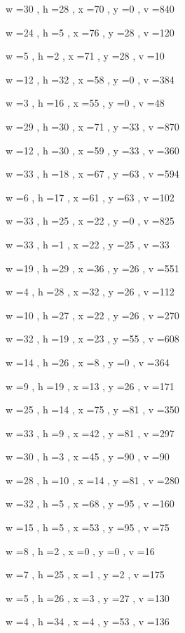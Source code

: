 \documentclass[11pt]{article}
\begin{document}
w =30 , h =28 , x =70 , y =0 , v =840
\par
w =24 , h =5 , x =76 , y =28 , v =120
\par
w =5 , h =2 , x =71 , y =28 , v =10
\par
w =12 , h =32 , x =58 , y =0 , v =384
\par
w =3 , h =16 , x =55 , y =0 , v =48
\par
w =29 , h =30 , x =71 , y =33 , v =870
\par
w =12 , h =30 , x =59 , y =33 , v =360
\par
w =33 , h =18 , x =67 , y =63 , v =594
\par
w =6 , h =17 , x =61 , y =63 , v =102
\par
w =33 , h =25 , x =22 , y =0 , v =825
\par
w =33 , h =1 , x =22 , y =25 , v =33
\par
w =19 , h =29 , x =36 , y =26 , v =551
\par
w =4 , h =28 , x =32 , y =26 , v =112
\par
w =10 , h =27 , x =22 , y =26 , v =270
\par
w =32 , h =19 , x =23 , y =55 , v =608
\par
w =14 , h =26 , x =8 , y =0 , v =364
\par
w =9 , h =19 , x =13 , y =26 , v =171
\par
w =25 , h =14 , x =75 , y =81 , v =350
\par
w =33 , h =9 , x =42 , y =81 , v =297
\par
w =30 , h =3 , x =45 , y =90 , v =90
\par
w =28 , h =10 , x =14 , y =81 , v =280
\par
w =32 , h =5 , x =68 , y =95 , v =160
\par
w =15 , h =5 , x =53 , y =95 , v =75
\par
w =8 , h =2 , x =0 , y =0 , v =16
\par
w =7 , h =25 , x =1 , y =2 , v =175
\par
w =5 , h =26 , x =3 , y =27 , v =130
\par
w =4 , h =34 , x =4 , y =53 , v =136
\par
\newpage


\end{document}

